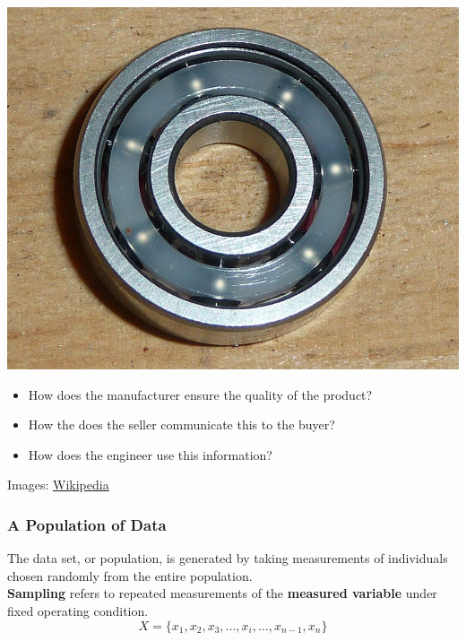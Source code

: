 \documentclass[fleqn]{beamer} %
\newcommand{\sectiontitleI}{A Population of Data}
\begin{document}
\begin{frame}[label=sectionI]
		\includegraphics[scale=.1]{bearing_fig3.jpeg}
		\begin{itemize}		
			\item How does the manufacturer ensure the quality of the product?
			\item How the does the seller communicate this to the buyer?
			\item How does the engineer use this information? 
		\end{itemize}
		
		{\tiny Images: \href{https://en.wikipedia.org/wiki/Ball_bearing}{Wikipedia} }

	\end{frame}
	
	\begin{frame} \small
		\frametitle{\sectiontitleI}    
		
		 
		 The data set, or population, is generated by taking measurements of individuals chosen randomly from the entire population. \\ 
		 
		 {\bf \RD Sampling} refers to repeated measurements of the {\bf \PR measured variable} under fixed operating condition.	\\
		 
		 \[ X = \{ x_1,x_2,x_3, ... , x_i , ... , x_{n-1}, x_{n} \}  \]

	\end{frame}
\end{document}
